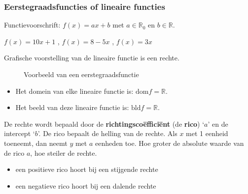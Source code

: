 \subsubsection{Eerstegraadsfuncties of lineaire functies}

\begin{definitie}
	Functievoorschrift: $f(x)=ax+b$ met $a\in\mathbb{R}_{0}$
en $b\in\mathbb{R}$.

\end{definitie}


\begin{voorbeeld}
	 $f(x)=10x+1$ , $f(x)=8-5x$ , $f(x)=3x$
\end{voorbeeld}

Grafische voorstelling van de lineaire functie is een rechte.


\begin{figure}[h]
	\centering          
	
	\caption{Voorbeeld van een eerstegraadsfunctie}
	\label{fig:eerstegraadsfunctie}	
\end{figure}




\begin{itemize}
	\item Het domein van elke lineaire functie is: $\textrm{dom} f = \mathbb{R}$.
	\item Het beeld van deze lineaire functie is: $\textrm{bld} f = \mathbb{R}$.
\end{itemize}

De rechte wordt bepaald door de \textbf{richtingsco\"effici\"ent}
(de \textbf{rico}) \textquoteleft $a$\textquoteright{} en de intercept
\textquoteleft $b$\textquoteright . De rico bepaalt de helling van
de rechte. Als $x$ met 1 eenheid toeneemt, dan neemt $y$ met $a$
eenheden toe. Hoe groter de absolute waarde van de rico $a$, hoe
steiler de rechte.
\begin{itemize}
\item een positieve rico hoort bij een stijgende rechte
\item een negatieve rico hoort bij een dalende rechte
\end{itemize}






